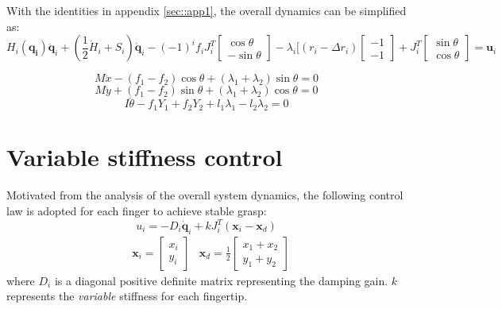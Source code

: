 \documentclass[]{article}
\begin{document}
With the identities in appendix \ref{sec::app1}, the overall dynamics can be simplified as:
\begin{equation}
H_i(\mathbf{q_i})\ddot{\mathbf{q}}_i+(\frac{1}{2}\dot{H}_i+S_i)\mathbf{\dot{q}}_i-(-1)^if_iJ_i^T\begin{bmatrix}
\cos\theta\\
-\sin\theta
\end{bmatrix}-\lambda_i[(r_i-\Delta r_i)\begin{bmatrix}
-1\\-1
\end{bmatrix} + J_i^T\begin{bmatrix}
\sin\theta\\\cos\theta
\end{bmatrix}=\mathbf{u}_i
\end{equation}

\begin{equation}
M\ddot{x}-(f_1-f_2)\cos\theta+(\lambda_1+\lambda_2)\sin\theta=0
\end{equation}
\begin{equation}
M\ddot{y}+(f_1-f_2)\sin\theta+(\lambda_1+\lambda_2)\cos\theta = 0
\end{equation}
\begin{equation}
I\ddot{\theta}-f_1Y_1+f_2Y_2+l_1\lambda_1-l_2\lambda_2=0
\end{equation}
\section{Variable stiffness control}
Motivated from the analysis of the overall system dynamics, the following control law is adopted for each finger to achieve stable grasp:
\begin{equation}
u_i=-D_i\mathbf{\dot{q}}_i+kJ_i^T(\mathbf{x}_i-\mathbf{x}_d)
\label{eqn::control}
\end{equation}
\begin{align}
&\mathbf{x}_i=\begin{bmatrix}
x_i\\
y_i
\end{bmatrix}
&\mathbf{x}_d=\frac{1}{2}\begin{bmatrix}
x_1+x_2\\
y_1+y_2
\end{bmatrix}
\end{align}
where $D_i$ is a diagonal positive definite matrix representing the damping gain. $k$ represents the \emph{variable} stiffness for each fingertip.
\end{document}
